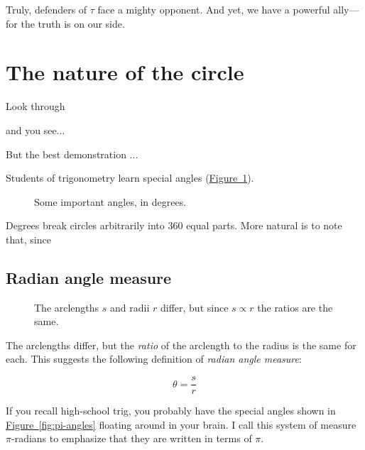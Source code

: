 \documentclass{article}
\begin{document}
Truly, defenders of $\tau$ face a mighty opponent. And yet, we have a powerful ally---for the truth is on our side.


\section{The nature of the circle} %
\label{sec:the_nature_of_the_circle}

Look through 

and you see...

But the best demonstration ...

Students of trigonometry learn special angles (\hyperref[fig:degree-angles]{Figure~}\ref{fig:degree-angles}).

\begin{figure}
\begin{center}
\end{center}
\caption{Some important angles, in degrees.\label{fig:degree-angles}}
\end{figure}

Degrees break circles arbitrarily into 360 equal parts. More natural is to note that, since 

 \subsection{Radian angle measure} %
 \label{sec:radian_angle_measure}
 

\begin{figure}
\begin{center}
\end{center}
\caption{The arclengths $s$ and radii $r$ differ, but since $s\propto r$ the ratios are the same.\label{fig:angle-arclength}}
\end{figure}

The arclengths differ, but the \emph{ratio} of the arclength to the radius is the same for each. This suggests the following definition of \emph{radian angle measure}:

\[ \theta = \frac{s}{r} \]

If you recall high-school trig, you probably have the special angles shown in \hyperref[fig:pi-angles]{Figure~}\ref{fig:pi-angles} floating around in your brain. I call this system of measure $\pi$-radians to emphasize that they are written in terms of $\pi$.
\end{document}
